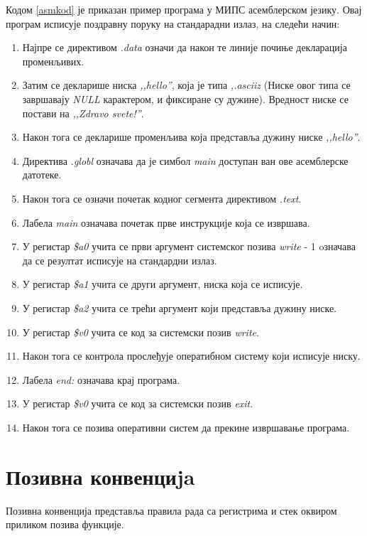 \documentclass[12pt,oneside]{memoir}
\begin{document}
Кодом \ref{asmkod} је приказан пример програма у МИПС асемблерском језику. Овај програм исписује поздравну поруку на стандарадни излаз, на следећи начин:
\begin{enumerate}
\item Најпре се директивом \textit{.data} означи да након те линије почиње декларација променљивих.
\item Затим се декларише ниска \textit{,,hello''}, која је типа \textit{,.asciiz} (Ниске овог типа се завршавају \textit{NULL} карактером, и фиксиране су дужине). Вредност ниске се постави на \textit{,,Zdravo svete!''}.
\item Након тога се декларише променљива која представља дужину ниске \textit{,,hello''}.
\item Директива \textit{.globl} означава да је симбол \textit{main} доступан ван ове асемблерске датотеке.
\item Након тога се означи почетак кодног сегмента директивом \textit{.text}.
\item Лабела \textit{main} означава почетак прве инструкције која се извршава.
\item У регистар \textit{\$a0} учита се први аргумент системског позива \textit{write} - 1 oзначава да се резултат исписује на стандардни излаз.
\item У регистар \textit{\$a1} учита се други аргумент, ниска која се исписује.
\item У регистар \textit{\$a2} учита се трећи аргумент који представља дужину ниске.
\item У регистар \textit{\$v0} учита се код за системски позив \textit{write}.
\item Након тога се контрола прослеђује оператибном систему који исписује ниску.
\item Лабела \textit{ end:} означава крај програма.
\item У регистар \textit{\$v0} учита се код за системски позив \textit{exit}.
\item Након тога се позива оперативни систем да прекине извршавање програма.
\end{enumerate}


\section{Позивна конвенциja}
\label{konvencija}

Позивна конвенција представља правила рада са регистрима и стек оквиром приликом позива функције.
\end{document}
